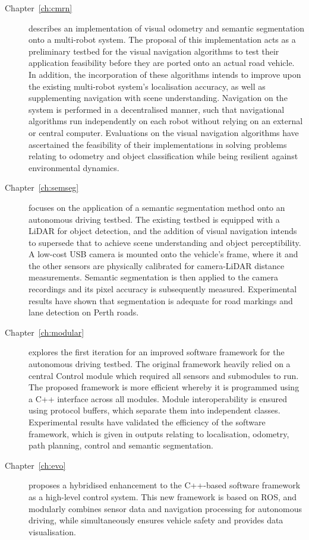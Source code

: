 \begin{description}
	\item[Chapter~\ref{ch:cmrn}] describes an implementation of visual odometry and semantic segmentation onto a multi-robot system. The proposal of this implementation acts as a preliminary testbed for the visual navigation algorithms to test their application feasibility before they are ported onto an actual road vehicle. In addition, the incorporation of these algorithms intends to improve upon the existing multi-robot system's localisation accuracy, as well as supplementing navigation with scene understanding. Navigation on the system is performed in a decentralised manner, such that navigational algorithms run independently on each robot without relying on an external or central computer. Evaluations on the visual navigation algorithms have ascertained the feasibility of their implementations in solving problems relating to odometry and object classification while being resilient against environmental dynamics. 
	\item [Chapter~\ref{ch:semseg}] focuses on the application of a semantic segmentation method onto an autonomous driving testbed. The existing testbed is equipped with a LiDAR for object detection, and the addition of visual navigation intends to supersede that to achieve scene understanding and object perceptibility. A low-cost USB camera is mounted onto the vehicle's frame, where it and the other sensors are physically calibrated for camera-LiDAR distance measurements. Semantic segmentation is then applied to the camera recordings and its pixel accuracy is subsequently measured. Experimental results have shown that segmentation is adequate for road markings and lane detection on Perth roads. 
	\item [Chapter~\ref{ch:modular}] explores the first iteration for an improved software framework for the autonomous driving testbed. The original framework heavily relied on a central Control module which required all sensors and submodules to run. The proposed framework is more efficient whereby it is programmed using a C++ interface across all modules. Module interoperability is ensured using protocol buffers, which separate them into independent classes. Experimental results have validated the efficiency of the software framework, which is given in outputs relating to localisation, odometry, path planning, control and semantic segmentation. 
	\item [Chapter~\ref{ch:evo}] proposes a hybridised enhancement to the C++-based software framework as a high-level control system. This new framework is based on ROS, and modularly combines sensor data and navigation processing for autonomous driving, while simultaneously ensures vehicle safety and provides data visualisation. %

\end{description}

